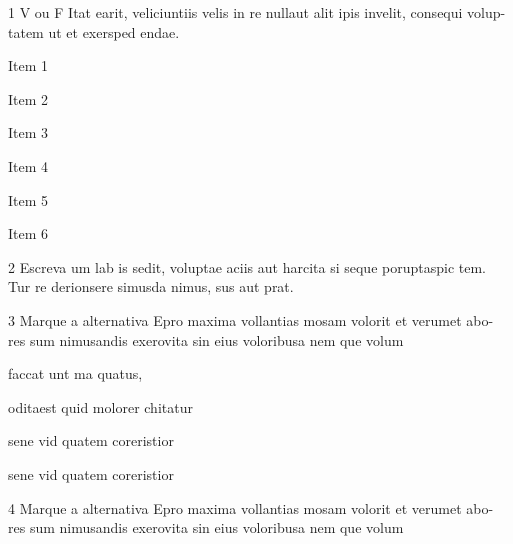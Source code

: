 \pagebreak
{}

\num{1} V ou F Itat earit, veliciuntiis velis in re nullaut alit ipis invelit, consequi volup-
tatem ut et exersped endae.

\begin{boxlist}
    \item Item 1 

    \item Item 2

    \item Item 3

    \item Item 4

    \item Item 5

    \item Item 6
\end{boxlist}


\num{2} Escreva um lab is sedit, voluptae aciis aut harcita si seque poruptaspic tem.
Tur re derionsere simusda nimus, sus aut prat.

\linhas

\num{3} Marque a alternativa Epro maxima vollantias mosam volorit et verumet abo-
res sum nimusandis exerovita sin eius voloribusa nem que volum

\begin{escolha}
\item faccat unt ma quatus,

\item oditaest quid molorer chitatur

\item sene vid quatem coreristior

\item sene vid quatem coreristior
\end{escolha}

\num{4} Marque a alternativa Epro maxima vollantias mosam volorit et verumet abo-
res sum nimusandis exerovita sin eius voloribusa nem que volum


\begin{multicols}{2}






\end{multicols}

